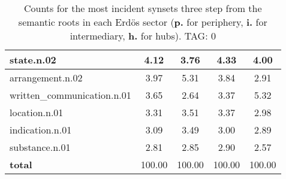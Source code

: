 \begin{table}[h!]
\begin{center}
\begin{tabular}{| l || c | c | c | c |}
state.n.02 & 4.12  & 3.76  & 4.33  & 4.00 \\\hline
arrangement.n.02 & 3.97  & 5.31  & 3.84  & 2.91 \\\hline
written\_communication.n.01 & 3.65  & 2.64  & 3.37  & 5.32 \\\hline
location.n.01 & 3.31  & 3.51  & 3.37  & 2.98 \\\hline
indication.n.01 & 3.09  & 3.49  & 3.00  & 2.89 \\\hline
substance.n.01 & 2.81  & 2.85  & 2.90  & 2.57 \\\hline\hline
{{\bf total}} & 100.00  & 100.00  & 100.00  & 100.00 \\\hline
\end{tabular}
\caption{Counts for the most incident synsets three step from the semantic roots in each Erd\"os sector ({\bf p.} for periphery, {\bf i.} for intermediary, {\bf h.} for hubs). TAG: 0}
\end{center}
\end{table}